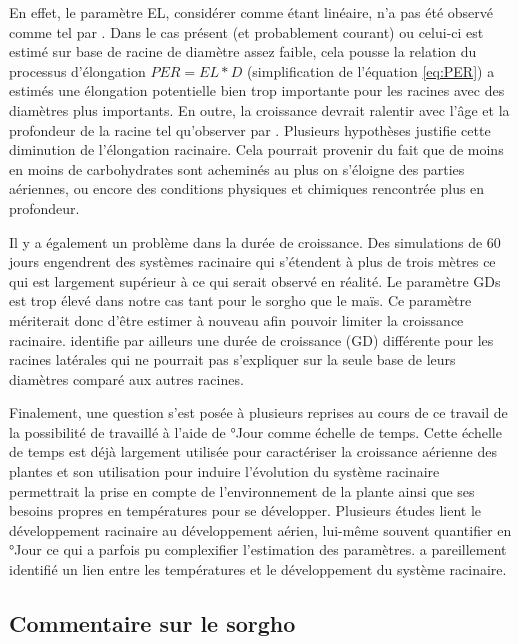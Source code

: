 En effet, le paramètre EL, considérer comme étant linéaire, n'a pas été observé comme tel par \cite{pellerinand_evaluation_1994}.
Dans le cas présent (et probablement courant) ou celui-ci est estimé sur base de racine de diamètre assez faible, cela pousse la relation du processus d'élongation $PER = EL*D$ (simplification de l'équation \ref{eq:PER}) a estimés une élongation potentielle bien trop importante pour les racines avec des diamètres plus importants.
En outre, la croissance devrait ralentir avec l'âge et la profondeur de la racine tel qu'observer par \cite{pellerinand_evaluation_1994}.
Plusieurs hypothèses justifie cette diminution de l'élongation racinaire.
Cela pourrait provenir du fait que de moins en moins de carbohydrates sont acheminés au plus on s'éloigne des parties aériennes, ou encore des conditions physiques et chimiques rencontrée plus en profondeur.
\newline

Il y a également un problème dans la durée de croissance.
Des simulations de 60 jours engendrent des systèmes racinaire qui s'étendent à plus de trois mètres ce qui est largement supérieur à ce qui serait observé en réalité.
Le paramètre GDs est trop élevé dans notre cas tant pour le sorgho que le maïs.
Ce paramètre mériterait donc d'être estimer à nouveau afin pouvoir limiter la croissance racinaire.
\cite{cahn_relationship_1989} identifie par ailleurs une durée de croissance (GD) différente pour les racines latérales qui ne pourrait pas s'expliquer sur la seule base de leurs diamètres comparé aux autres racines.
\newline

Finalement, une question s'est posée à plusieurs reprises au cours de ce travail de la possibilité de travaillé à l'aide de °Jour comme échelle de temps.
Cette échelle de temps est déjà largement utilisée pour caractériser la croissance aérienne des plantes et son utilisation pour induire l'évolution du système racinaire permettrait la prise en compte de l'environnement de la plante ainsi que ses besoins propres en températures pour se développer.
Plusieurs études lient le développement racinaire au développement aérien, lui-même souvent quantifier en °Jour ce qui a parfois pu complexifier l'estimation des paramètres.
\cite{pellerinand_evaluation_1994} a pareillement identifié un lien entre les températures et le développement du système racinaire.

\subsection{Commentaire sur le sorgho}


